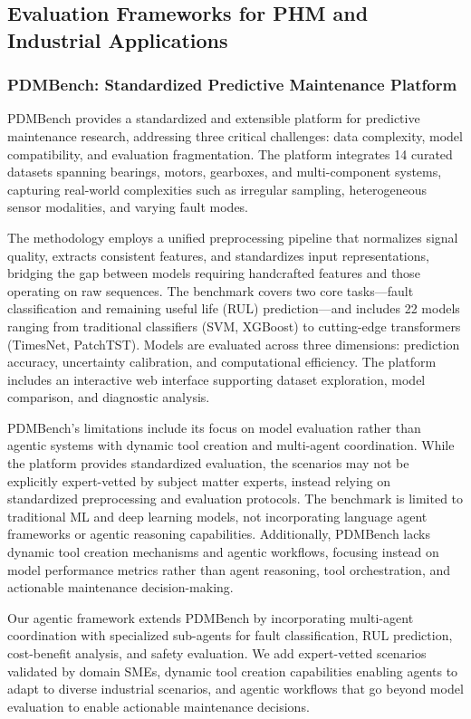 \documentclass[conference]{IEEEtran}
\begin{document}
\subsection{Evaluation Frameworks for PHM and Industrial Applications}

\subsubsection{PDMBench: Standardized Predictive Maintenance Platform}

PDMBench \cite{pdmbench} provides a standardized and extensible platform for predictive maintenance research, addressing three critical challenges: data complexity, model compatibility, and evaluation fragmentation. The platform integrates 14 curated datasets spanning bearings, motors, gearboxes, and multi-component systems, capturing real-world complexities such as irregular sampling, heterogeneous sensor modalities, and varying fault modes.

The methodology employs a unified preprocessing pipeline that normalizes signal quality, extracts consistent features, and standardizes input representations, bridging the gap between models requiring handcrafted features and those operating on raw sequences. The benchmark covers two core tasks—fault classification and remaining useful life (RUL) prediction—and includes 22 models ranging from traditional classifiers (SVM, XGBoost) to cutting-edge transformers (TimesNet, PatchTST). Models are evaluated across three dimensions: prediction accuracy, uncertainty calibration, and computational efficiency. The platform includes an interactive web interface supporting dataset exploration, model comparison, and diagnostic analysis.

PDMBench's limitations include its focus on model evaluation rather than agentic systems with dynamic tool creation and multi-agent coordination. While the platform provides standardized evaluation, the scenarios may not be explicitly expert-vetted by subject matter experts, instead relying on standardized preprocessing and evaluation protocols. The benchmark is limited to traditional ML and deep learning models, not incorporating language agent frameworks or agentic reasoning capabilities. Additionally, PDMBench lacks dynamic tool creation mechanisms and agentic workflows, focusing instead on model performance metrics rather than agent reasoning, tool orchestration, and actionable maintenance decision-making.

Our agentic framework extends PDMBench by incorporating multi-agent coordination with specialized sub-agents for fault classification, RUL prediction, cost-benefit analysis, and safety evaluation. We add expert-vetted scenarios validated by domain SMEs, dynamic tool creation capabilities enabling agents to adapt to diverse industrial scenarios, and agentic workflows that go beyond model evaluation to enable actionable maintenance decisions.
\end{document}
